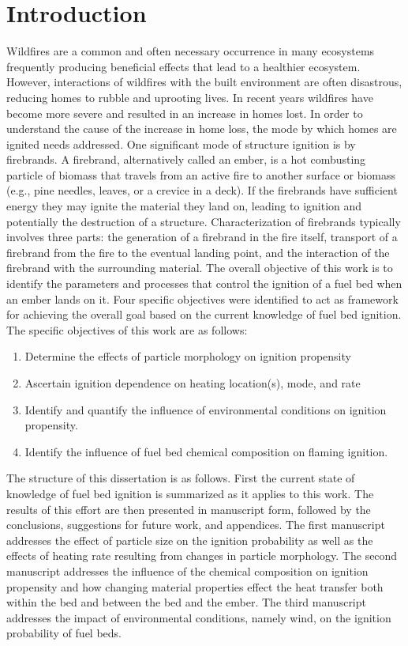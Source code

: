 
\chapter{Introduction}
\label{part:intro}


   Wildfires are a common and often necessary occurrence in many ecosystems frequently producing beneficial effects that lead to a healthier ecosystem. However, interactions of wildfires with the built environment are often disastrous, reducing homes to rubble and uprooting lives. In recent years wildfires have become more severe and resulted in an increase in homes lost. In order to understand the cause of the increase in home loss, the mode by which homes are ignited needs addressed. One significant mode of structure ignition is by firebrands. A firebrand, alternatively called an ember, is a hot combusting particle of biomass that travels from an active fire to another surface or biomass (e.g., pine needles, leaves, or a crevice in a deck). If the firebrands have sufficient energy they  may ignite the material they land on, leading to ignition and potentially the destruction of a structure. Characterization of firebrands typically involves three parts: the generation of a firebrand in the fire itself, transport of a firebrand from the fire to the eventual landing point, and the interaction of the firebrand with the surrounding material. The overall objective of this work is to identify the parameters and processes that control the ignition of a fuel bed when an ember lands on it. Four specific objectives were identified to act as framework for achieving the overall goal based on the current knowledge of fuel bed ignition. The specific objectives of this work are as follows:
        \begin{enumerate}
            \item Determine the effects of particle morphology on ignition propensity
            \item Ascertain ignition dependence on heating location(s), mode, and rate
            \item Identify and quantify the influence of environmental conditions on ignition propensity.
            \item Identify the influence of fuel bed chemical composition on flaming ignition.
        \end{enumerate}
    The structure of this dissertation is as follows. First the current state of knowledge of fuel bed ignition is summarized as it applies to this work. The results of this effort are then presented in manuscript form, followed by the conclusions, suggestions for future work, and appendices. 
    The first manuscript addresses the effect of particle size on the ignition probability as well as the effects of heating rate resulting from changes in particle morphology. The second manuscript addresses the influence of the chemical composition on ignition propensity and how changing material properties effect the heat transfer both within the bed and between the bed and the ember. The third manuscript addresses the impact of environmental conditions, namely wind, on the ignition probability of fuel beds.
    
